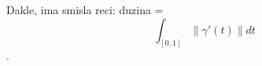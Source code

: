 \documentclass[preview]{standalone}
\begin{document}
\begin{center}
Dakle, ima smisla reci: duzina = \[\int_{[0,1]} \lVert \gamma'(t)\rVert dt\].
\end{center}
\end{document}
